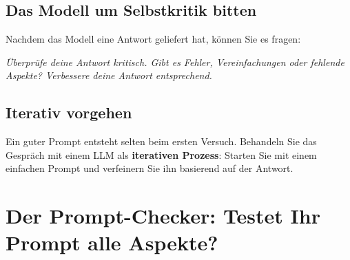 \subsection{Das Modell um Selbstkritik bitten}

\begin{myexample}
Nachdem das Modell eine Antwort geliefert hat, können Sie es fragen:
\begin{center}
    \textit{Überprüfe deine Antwort kritisch. Gibt es Fehler, Vereinfachungen
    oder fehlende Aspekte? Verbessere deine Antwort entsprechend.}
\end{center}
\end{myexample}

\subsection{Iterativ vorgehen}

\begin{myremark}
Ein guter Prompt entsteht selten beim ersten Versuch. Behandeln Sie das Gespräch
mit einem LLM als \textbf{iterativen Prozess}: Starten Sie mit einem einfachen
Prompt und verfeinern Sie ihn basierend auf der Antwort.
\end{myremark}

\section{Der Prompt-Checker: Testet Ihr Prompt alle Aspekte?}

